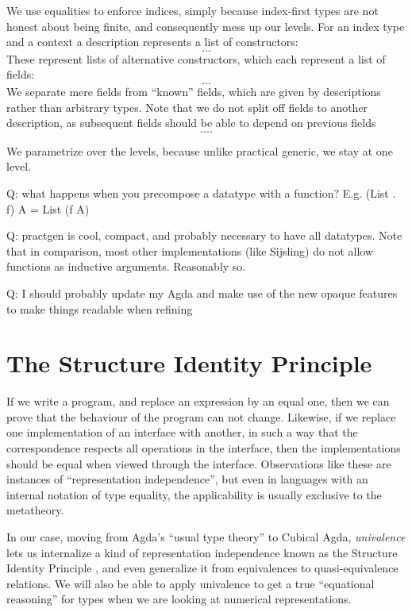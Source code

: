 \documentclass[10pt]{article}
\theoremstyle{plain}
\theoremstyle{definition}
\newcommand{\towrite}[1]{\todo[color=cyan]{#1}}
\begin{document}
We use equalities to enforce indices, simply because index-first types are not honest about being finite, and consequently mess up our levels. For an index type and a context a description represents a list of constructors:
\[ \dots \]
These represent lists of alternative constructors, which each represent a list of fields:
\[ \dots \]
We separate mere fields from ``known'' fields, which are given by descriptions rather than arbitrary types. Note that we do not split off fields to another description, as subsequent fields should be able to depend on previous fields
\[ \dots. \]


We parametrize over the levels, because unlike practical generic, we stay at one level.

Q: what happens when you precompose a datatype with a function? E.g. (List . f) A = List (f A) 

Q: practgen is cool, compact, and probably necessary to have all datatypes. Note that in comparison, most other implementations (like Sijsling) do not allow functions as inductive arguments. Reasonably so.

Q: I should probably update my Agda and make use of the new opaque features to make things readable when refining


\towrite{Adapt this to the non-proposal form.}

\section{The Structure Identity Principle}
If we write a program, and replace an expression by an equal one, then we can prove that the behaviour of the program can not change. Likewise, if we replace one implementation of an interface with another, in such a way that the correspondence respects all operations in the interface, then the implementations should be equal when viewed through the interface. Observations like these are instances of ``representation independence'', but even in languages with an internal notation of type equality, the applicability is usually exclusive to the metatheory.

In our case, moving from Agda's ``usual type theory'' to Cubical Agda, \textit{univalence} \cite{cuagda} lets us internalize a kind of representation independence known as the Structure Identity Principle \cite{iri}, and even generalize it from equivalences to quasi-equivalence relations. 
We will also be able to apply univalence to get a true ``equational reasoning'' for types when we are looking at numerical representations.
\end{document}
